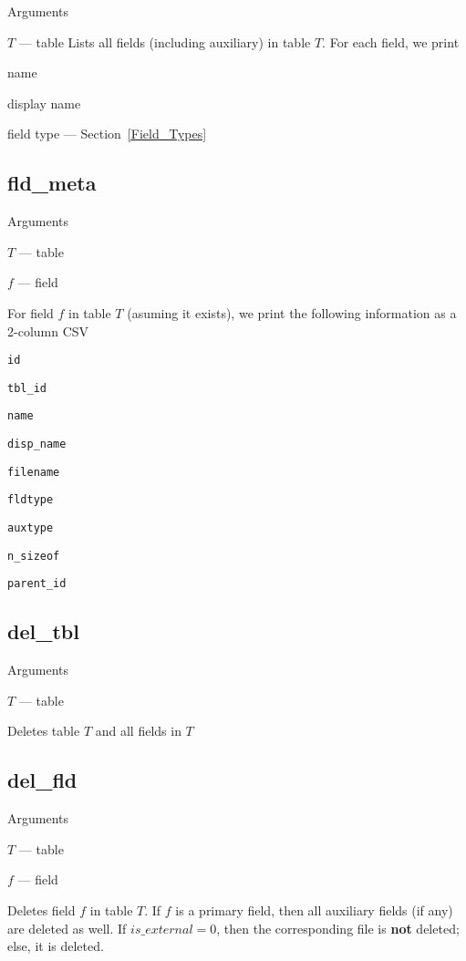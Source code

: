 Arguments
\be
\item \(T\) --- table
\ee
Lists all fields (including auxiliary) in table \(T\). 
For each field, we print
\be
\item name
\item display name
\item field type --- Section~\ref{Field_Types}
\ee

\subsection{fld\_meta}
\label{fld_meta}

Arguments 
\be
\item \(T\) --- table
\item \(f\) --- field
\ee

For field \(f\) in table \(T\) (asuming it exists), we print the
following information as a 2-column CSV
\be
\item \verb+id+
\item \verb+tbl_id+
\item \verb+name+
\item \verb+disp_name+
\item \verb+filename+
\item \verb+fldtype+
\item \verb+auxtype+
\item \verb+n_sizeof+
\item \verb+parent_id+
\ee


\subsection{del\_tbl}
\label{del_tbl}

Arguments
\be
\item \(T\) --- table
\ee

Deletes table \(T\) and all fields in \(T\)

\subsection{del\_fld}
\label{del_fld}

Arguments 
\be
\item \(T\) --- table
\item \(f\) --- field
\ee

Deletes field \(f\) in table \(T\). If \(f\) is a primary field, then
all auxiliary fields (if any) are deleted as well. If \(is\_external = 0\), then the corresponding file is {\bf not} deleted; else, it is deleted.

